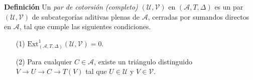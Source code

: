 \documentclass[preview]{standalone}
\begin{document}
\begin{center}
\justifying \textbf{Definición} Un \emph{par de cotorsión (completo)} $(\mathcal{U}, \mathcal{V})$ en $(\mathscr{A}, T, \Delta)$ es un par $(\mathcal{U}, \mathcal{V})$ de subcategorías aditivas plenas de $\mathscr{A}$, cerradas por sumandos directos en $\mathscr{A}$, tal que cumple las siguientes condiciones.\begin{itemize} \item[(1)] $\text{Ext}^1_{(\mathscr{A}, T, \Delta)}(\mathcal{U}, \mathcal{V}) = 0$. \item[(2)] Para cualquier $C\in\mathscr{A}$, existe un triángulo distinguido $V\to U\to C\to T(V)$ tal que $U\in\mathcal{U}$ y $V\in\mathcal{V}$. \end{itemize}
\end{center}
\end{document}
